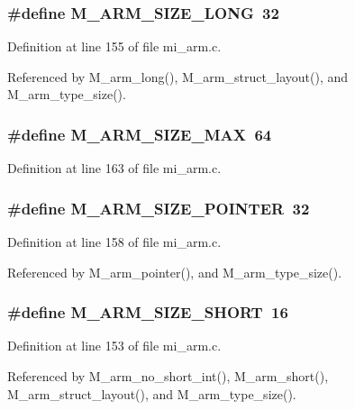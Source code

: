 \subsubsection{\setlength{\rightskip}{0pt plus 5cm}\#define M\_\-ARM\_\-SIZE\_\-LONG~32}\label{mi__arm_8c_69b5207b10b60b821721b4d1c5eb05d9}




Definition at line 155 of file mi\_\-arm.c.

Referenced by M\_\-arm\_\-long(), M\_\-arm\_\-struct\_\-layout(), and M\_\-arm\_\-type\_\-size().
\subsubsection{\setlength{\rightskip}{0pt plus 5cm}\#define M\_\-ARM\_\-SIZE\_\-MAX~64}\label{mi__arm_8c_3c74d41e6e727c7f5c061f3f377dc2ca}




Definition at line 163 of file mi\_\-arm.c.
\subsubsection{\setlength{\rightskip}{0pt plus 5cm}\#define M\_\-ARM\_\-SIZE\_\-POINTER~32}\label{mi__arm_8c_45bafeedf707ede81e7b8ee2aefcc517}




Definition at line 158 of file mi\_\-arm.c.

Referenced by M\_\-arm\_\-pointer(), and M\_\-arm\_\-type\_\-size().
\subsubsection{\setlength{\rightskip}{0pt plus 5cm}\#define M\_\-ARM\_\-SIZE\_\-SHORT~16}\label{mi__arm_8c_8f3d6f6a8227131aec865ac6452a828e}




Definition at line 153 of file mi\_\-arm.c.

Referenced by M\_\-arm\_\-no\_\-short\_\-int(), M\_\-arm\_\-short(), M\_\-arm\_\-struct\_\-layout(), and M\_\-arm\_\-type\_\-size().
